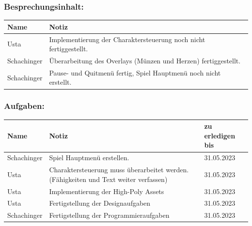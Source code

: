 \subsubsection*{Besprechungsinhalt:}
\begin{tabular}{|m{}|m{}|}
\hline
Name & Notiz \\
\hline
Usta & Implementierung der Charaktersteuerung noch nicht fertiggestellt. \\
\hline
Schachinger & Überarbeitung des Overlays (Münzen und Herzen) fertiggestellt. \\
\hline
Schachinger & Pause- und Quitmenü fertig, Spiel Hauptmenü noch nicht erstellt. \\
\hline
\end{tabular}

\subsubsection*{Aufgaben:}
\begin{tabular}{|m{}|m{}|m{}|}
\hline
Name & Notiz & zu erledigen bis \\
\hline
Schachinger & Spiel Hauptmenü erstellen. & 31.05.2023 \\
\hline
Usta & Charaktersteuerung muss überarbeitet werden. (Fähigkeiten und Text weiter verfassen) & 31.05.2023 \\
\hline
Usta & Implementierung der High-Poly Assets & 31.05.2023 \\
\hline
Usta & Fertigstellung der Designaufgaben & 31.05.2023 \\
\hline
Schachinger & Fertigstellung der Programmieraufgaben & 31.05.2023 \\
\hline
\end{tabular}


\pagebreak

